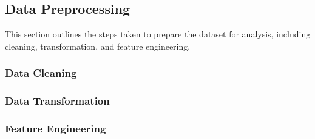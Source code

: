 \subsection{Data Preprocessing}
\label{subsec:preprocessing}

This section outlines the steps taken to prepare the dataset for analysis, including cleaning, transformation, and feature engineering.


\subsubsection{Data Cleaning}

\subsubsection{Data Transformation}

\subsubsection{Feature Engineering}


